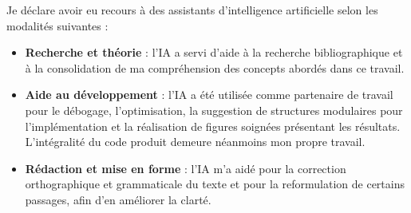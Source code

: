 \documentclass[11pt,a4paper]{report}
\theoremstyle{plain}
\theoremstyle{definition}
\begin{document}
Je déclare avoir eu recours à des assistants d'intelligence
artificielle selon les modalités suivantes :

\begin{itemize}
  \item \textbf{Recherche et théorie} : l'IA a servi d'aide à la
  recherche bibliographique et à la consolidation de ma compréhension
  des concepts abordés dans ce travail. \\

  \item \textbf{Aide au développement} : l'IA a été utilisée comme
  partenaire de travail pour le débogage, l'optimisation, la
  suggestion de structures modulaires pour l'implémentation et la
  réalisation de figures soignées présentant les résultats.
  L'intégralité du code produit demeure néanmoins mon propre travail. \\

  \item \textbf{Rédaction et mise en forme} : l'IA m'a aidé pour la
  correction orthographique et grammaticale du texte et pour la
  reformulation de certains passages, afin d'en améliorer la clarté.
\end{itemize}

\clearpage
\end{document}
